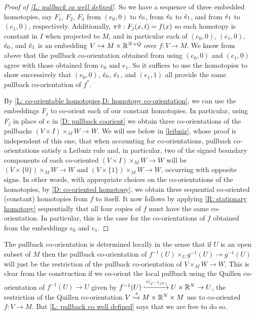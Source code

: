 \begin{proof}[Proof of \cref{L: pullback co well defined}]
	So we have a sequence of three embedded homotopies, say $F_1$, $F_2$, $F_3$ from $(e_0,0)$ to $\tilde e_0$, from $\tilde e_0$ to $\tilde e_1$, and from $\tilde e_1$ to $(e_1,0)$, respectively.
	Additionally, $\pi \tilde \pi:F_j(x,t) = f(x)$ so each homotopy is constant in $I$ when projected to $M$, and in particular each of $(e_0,0)$, $(e_1,0)$, $\tilde e_0$, and $\tilde e_1$ is an embedding $V \hookrightarrow M \times \mathbb{R}^{N+Q}$ over $f \colon V \to M$.
	We know from above that the pullback co-orientation obtained from using $(e_0,0)$ and $(e_1,0)$ agree with those obtained from $e_0$ and $e_1$.
	So it suffices to use the homotopies to show successively that $(e_0,0)$, $\tilde e_0$, $\tilde e_1$, and $(e_1,1)$ all provide the same pullback co-orientation of $f^*$.

	By \cref{L: co-orientable homotopies,D: homotopy co-orientation}, we can use the embeddings $F_j$ to co-orient each of our constant homotopies.
	In particular, using $F_j$ in place of $e$ in \cref{D: pullback coorient} we obtain three co-orientations of the pullbacks $(V \times I) \times_M W \to W$.
	We will see below in \cref{leibniz}, whose proof is independent of this one, that when accounting for co-orientations, pullback co-orientations satisfy a Leibniz rule and, in particular, two of the signed boundary components of each co-oriented $(V \times I) \times_M W \to W$ will be $(V \times \{0\}) \times_M W \to W$ and $(V \times \{1\}) \times_M W \to W$, occurring with opposite signs.
	In other words, with appropriate choices on the co-orientations of the homotopies, by \cref{D: co-oriented homotopy}, we obtain three sequential co-oriented (constant) homotopies from $f$ to itself.
	It now follows by applying \cref{R: stationary homotopy} sequentially that all four copies of $f$ must have the same co-orientation.
	In particular, this is the case for the co-orientations of $f$ obtained from the embeddings $e_0$ and $e_1$.
\end{proof}

\begin{remark}\label{R: local pullback co-orientations}
	The pullback co-orientation is determined locally in the sense that if $U$ is an open subset of $M$ then the pullback co-orientation of $f^{-1}(U) \times_U g^{-1}(U) \to g^{-1}(U)$ will just be the restriction of the pullback co-orientation of $V \times_M W \to W$.
	This is clear from the construction if we co-orient the local pullback using the Quillen co-orientation of $f^{-1}(U) \to U$ given by $f^{-1}(U) \xhookrightarrow{e|_{f^{-1}(U)}} U \times \mathbb{R}^N \to U$, the restriction of the Quillen co-orientation $V\xhookrightarrow{e}M \times \mathbb{R}^N \times M$ use to co-oriented $f \colon V \to M$.
	But \cref{L: pullback co well defined} says that we are free to do so.
\end{remark}

